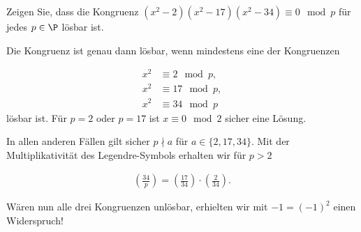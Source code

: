 
\begin{exercise}

Zeigen Sie, dass die Kongruenz $(x^2 - 2)(x^2 - 17)(x^2 - 34) \equiv 0 \mod{p}$
für jedes $p \in \P$ lösbar ist.

\end{exercise}


\begin{solution}

Die Kongruenz ist genau dann lösbar, wenn mindestens eine der Kongruenzen

\begin{align*}
    x^2 &\equiv 2 \mod{p}, \\
    x^2 &\equiv 17 \mod{p}, \\
    x^2 &\equiv 34 \mod{p}
\end{align*}
lösbar ist. Für $p = 2$ oder $p = 17$ ist $x \equiv 0 \mod{2}$ sicher eine Lösung.

In allen anderen Fällen gilt sicher $p \nmid a$ für $a \in \{2,17,34\}$. 
Mit der Multiplikativität des Legendre-Symbols erhalten wir für $p > 2$

\begin{align*}
    \left(\frac{34}{p}\right) = \left(\frac{17}{34}\right) \cdot \left(\frac{2}{34}\right).
\end{align*}

Wären nun alle drei Kongruenzen unlösbar, erhielten wir mit $-1 = (-1)^2$ einen Widerspruch!
\end{solution}

